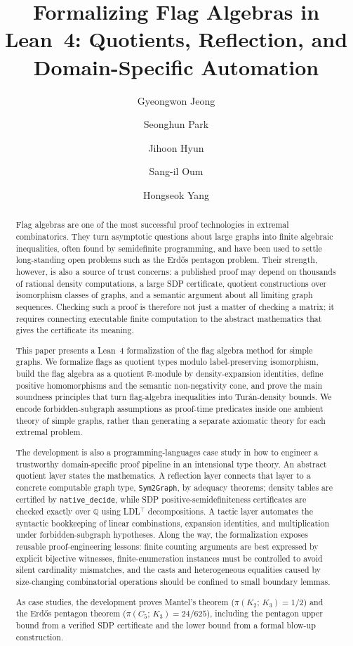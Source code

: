 \documentclass{article}
\title{Formalizing Flag Algebras in Lean~4: Quotients, Reflection, and Domain-Specific Automation}
\date{}
\author[1]{Gyeongwon Jeong}
\author[1]{Seonghun Park}
\author[1]{Jihoon Hyun}
\author[2]{Sang-il Oum}
\author[3]{Hongseok Yang}
\affil[1]{School of Computing, KAIST, South Korea}
\affil[2]{Discrete Mathematics Group, Institute for Basic Science (IBS), South Korea}
\affil[3]{School of Computational Sciences, Korea Institute for Advanced Study (KIAS), South Korea}
\newcommand{\tdensity}[2]{\pi(#1;\,#2)}
\newcommand{\lean}[1]{\texttt{#1}}
\begin{document}
\maketitle

\begin{abstract}
Flag algebras are one of the most successful proof technologies in extremal
combinatorics.  They turn asymptotic questions about large graphs into finite
algebraic inequalities, often found by semidefinite programming, and have been
used to settle long-standing open problems such as the Erd\H{o}s pentagon
problem.  Their strength, however, is also a source of trust concerns: a
published proof may depend on thousands of rational density computations, a
large SDP certificate, quotient constructions over isomorphism classes of
graphs, and a semantic argument about all limiting graph sequences.  Checking
such a proof is therefore not just a matter of checking a matrix; it requires
connecting executable finite computation to the abstract mathematics that gives
the certificate its meaning.

This paper presents a Lean~4 formalization of the flag algebra method for
simple graphs.  We formalize flags as quotient types modulo label-preserving
isomorphism, build the flag algebra as a quotient $\mathbb{R}$-module by
density-expansion identities, define positive homomorphisms and the semantic
non-negativity cone, and prove the main soundness principles that turn
flag-algebra inequalities into Tur\'an-density bounds.  We encode
forbidden-subgraph assumptions as proof-time predicates inside one ambient
theory of simple graphs, rather than generating a separate axiomatic theory
for each extremal problem.

The development is also a programming-languages case study in how to engineer
a trustworthy domain-specific proof pipeline in an intensional type theory.
An abstract quotient layer states the mathematics.  A reflection layer connects
that layer to a concrete computable graph type, \lean{Sym2Graph}, by adequacy
theorems; density tables are certified by \lean{native\_decide}, while SDP
positive-semidefiniteness certificates are checked exactly over $\mathbb{Q}$
using LDL$^\top$ decompositions.  A tactic layer automates the syntactic
bookkeeping of linear combinations, expansion identities, and multiplication
under forbidden-subgraph hypotheses.  Along the way, the formalization exposes
reusable proof-engineering lessons: finite counting arguments are best
expressed by explicit bijective witnesses, finite-enumeration instances must
be controlled to avoid silent cardinality mismatches, and the casts and
heterogeneous equalities caused by size-changing combinatorial operations
should be confined to small boundary lemmas.

As case studies, the development proves Mantel's theorem
($\tdensity{K_2}{K_3}=1/2$) and the Erd\H{o}s pentagon theorem
($\tdensity{C_5}{K_3}=24/625$), including the pentagon upper bound from a
verified SDP certificate and the lower bound from a formal blow-up
construction.
\end{abstract}
\end{document}
